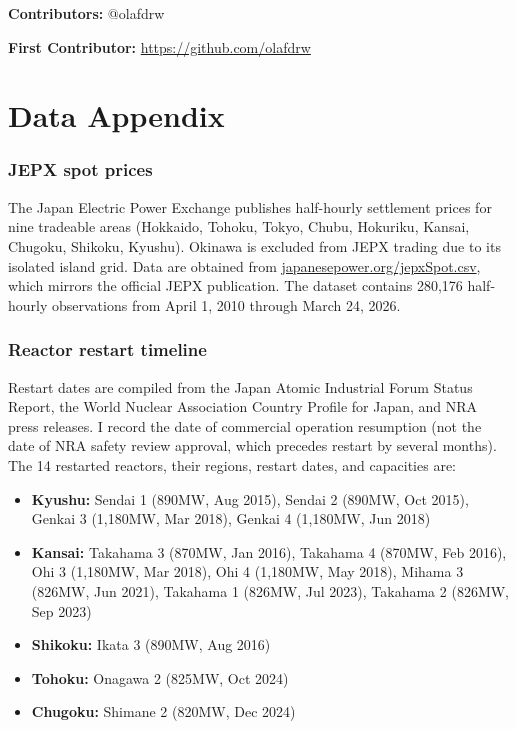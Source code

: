 \documentclass[12pt]{article}
\begin{document}
\noindent\textbf{Contributors:} @olafdrw

\noindent\textbf{First Contributor:} \url{https://github.com/olafdrw}

\label{apep_main_text_end}
\newpage


\newpage
\appendix

\section{Data Appendix}
\label{app:data}

\subsubsection*{JEPX spot prices} The Japan Electric Power Exchange publishes half-hourly settlement prices for nine tradeable areas (Hokkaido, Tohoku, Tokyo, Chubu, Hokuriku, Kansai, Chugoku, Shikoku, Kyushu). Okinawa is excluded from JEPX trading due to its isolated island grid. Data are obtained from \url{japanesepower.org/jepxSpot.csv}, which mirrors the official JEPX publication. The dataset contains 280,176 half-hourly observations from April 1, 2010 through March 24, 2026.

\subsubsection*{Reactor restart timeline} Restart dates are compiled from the Japan Atomic Industrial Forum Status Report, the World Nuclear Association Country Profile for Japan, and NRA press releases. I record the date of commercial operation resumption (not the date of NRA safety review approval, which precedes restart by several months). The 14 restarted reactors, their regions, restart dates, and capacities are:

\begin{itemize}
\item \textbf{Kyushu:} Sendai 1 (890MW, Aug 2015), Sendai 2 (890MW, Oct 2015), Genkai 3 (1,180MW, Mar 2018), Genkai 4 (1,180MW, Jun 2018)
\item \textbf{Kansai:} Takahama 3 (870MW, Jan 2016), Takahama 4 (870MW, Feb 2016), Ohi 3 (1,180MW, Mar 2018), Ohi 4 (1,180MW, May 2018), Mihama 3 (826MW, Jun 2021), Takahama 1 (826MW, Jul 2023), Takahama 2 (826MW, Sep 2023)
\item \textbf{Shikoku:} Ikata 3 (890MW, Aug 2016)
\item \textbf{Tohoku:} Onagawa 2 (825MW, Oct 2024)
\item \textbf{Chugoku:} Shimane 2 (820MW, Dec 2024)
\end{itemize}
\end{document}
